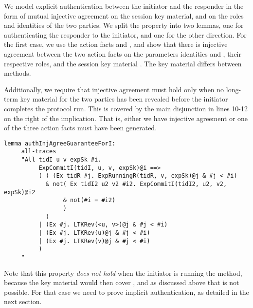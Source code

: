 We model explicit authentication between the initiator and the
responder in the form of mutual injective agreement on the session key material,
and on the roles and identities of the two parties.
%
We split the property into two lemmas, one for authenticating the responder to the
initiator, and one for the other direction.
%
For the first case, we use the action facts  and
, and show that there is injective agreement
between the two action facts on the parameters identities  and ,
their respective roles,  and the session key material .
%
The key material differs between \mEdhoc{} methods.
%

Additionally, we require that injective agreement must hold only when
no long-term key material for the two parties has been revealed before
the initiator completes the protocol run.
%
This is covered by the main disjunction in lines 10-12 on the right of
the implication.
%
That is, either we have injective agreement or one of
the three  action facts must have been generated.
%


\begin{lstlisting}
lemma authInjAgreeGuaranteeForI:
     all-traces
     "All tidI u v expSk #i.
          ExpCommitI(tidI, u, v, expSk)@i ==>
          ( ( (Ex tidR #j. ExpRunningR(tidR, v, expSk)@j & #j < #i)
            & not( Ex tidI2 u2 v2 #i2. ExpCommitI(tidI2, u2, v2, expSk)@i2
                 & not(#i = #i2)
                 )
            )
          | (Ex #j. LTKRev(<u, v>)@j & #j < #i)
          | (Ex #j. LTKRev(u)@j & #j < #i)
          | (Ex #j. LTKRev(v)@j & #j < #i)
          )
     "
\end{lstlisting}

Note that this property \emph{does not hold} when the initiator is
running the \mStat{} method, because the key material would then cover \mGiy{},
and as discussed above that is not possible.
%
For that case we need to prove implicit authentication, as detailed in
the next section.

